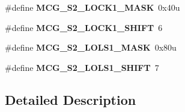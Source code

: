 \begin{DoxyCompactItemize}
\item 
\hypertarget{group___m_c_g___register___masks_gad10ac96bb0d1e24c13454ff02aaa1325}{}\#define {\bfseries M\+C\+G\+\_\+\+S2\+\_\+\+L\+O\+C\+K1\+\_\+\+M\+A\+S\+K}~0x40u\label{group___m_c_g___register___masks_gad10ac96bb0d1e24c13454ff02aaa1325}

\item 
\hypertarget{group___m_c_g___register___masks_gadadb0262376f483c0d6f5de6c6febbf9}{}\#define {\bfseries M\+C\+G\+\_\+\+S2\+\_\+\+L\+O\+C\+K1\+\_\+\+S\+H\+I\+F\+T}~6\label{group___m_c_g___register___masks_gadadb0262376f483c0d6f5de6c6febbf9}

\item 
\hypertarget{group___m_c_g___register___masks_ga46c4e9088b8d30c213cd1edd57fd5bd3}{}\#define {\bfseries M\+C\+G\+\_\+\+S2\+\_\+\+L\+O\+L\+S1\+\_\+\+M\+A\+S\+K}~0x80u\label{group___m_c_g___register___masks_ga46c4e9088b8d30c213cd1edd57fd5bd3}

\item 
\hypertarget{group___m_c_g___register___masks_gac8e4b55205f23ce950b66417bc3f6909}{}\#define {\bfseries M\+C\+G\+\_\+\+S2\+\_\+\+L\+O\+L\+S1\+\_\+\+S\+H\+I\+F\+T}~7\label{group___m_c_g___register___masks_gac8e4b55205f23ce950b66417bc3f6909}

\end{DoxyCompactItemize}


\subsection{Detailed Description}

